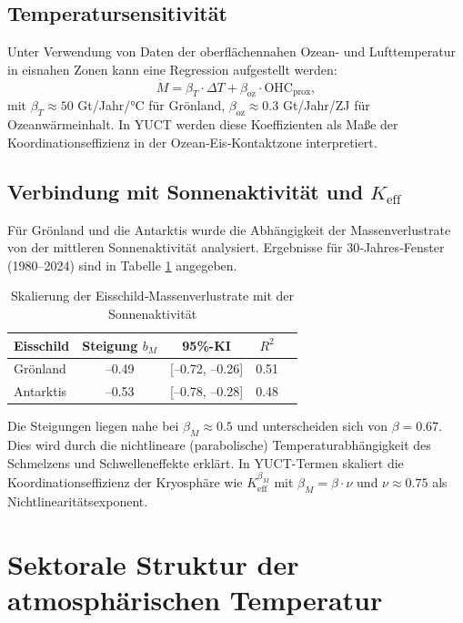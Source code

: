 \documentclass[12pt,a4paper]{article}
\newcommand{\Keff}{K_{\mathrm{eff}}}
\newcommand{\be}{\beta}
\begin{document}
	\subsection{Temperatursensitivität}
	
	Unter Verwendung von Daten der oberflächennahen Ozean- und Lufttemperatur in eisnahen Zonen kann eine Regression aufgestellt werden:
	\[
	\dot{M} = \beta_T \cdot \Delta T + \beta_{\text{oz}} \cdot \text{OHC}_{\text{prox}},
	\]
	mit \(\beta_T \approx 50\) Gt/Jahr/°C für Grönland, \(\beta_{\text{oz}} \approx 0.3\) Gt/Jahr/ZJ für Ozeanwärmeinhalt. In YUCT werden diese Koeffizienten als Maße der Koordinationseffizienz in der Ozean‑Eis‑Kontaktzone interpretiert.
	
	\subsection{Verbindung mit Sonnenaktivität und \(\Keff\)}
	
	Für Grönland und die Antarktis wurde die Abhängigkeit der Massenverlustrate von der mittleren Sonnenaktivität analysiert. Ergebnisse für 30‑Jahres‑Fenster (1980–2024) sind in Tabelle \ref{tab:icescaling} angegeben.
	
	\begin{table}[htbp]
		\centering
		\caption{Skalierung der Eisschild‑Massenverlustrate mit der Sonnenaktivität}
		\label{tab:icescaling}
		\begin{tabular}{@{}lcccc@{}}
			\toprule
			Eisschild & Steigung \(b_M\) & 95\%-KI & \(R^2\) \\
			\midrule
			Grönland & –0.49 & [–0.72, –0.26] & 0.51 \\
			Antarktis & –0.53 & [–0.78, –0.28] & 0.48 \\
			\bottomrule
		\end{tabular}
	\end{table}
	
	Die Steigungen liegen nahe bei \(\beta_M \approx 0.5\) und unterscheiden sich von \(\be = 0.67\). Dies wird durch die nichtlineare (parabolische) Temperaturabhängigkeit des Schmelzens und Schwelleneffekte erklärt. In YUCT-Termen skaliert die Koordinationseffizienz der Kryosphäre wie \(\Keff^{\beta_M}\) mit \(\beta_M = \be \cdot \nu\) und \(\nu \approx 0.75\) als Nichtlinearitätsexponent.
	
	\section{Sektorale Struktur der atmosphärischen Temperatur}
	
\end{document}

